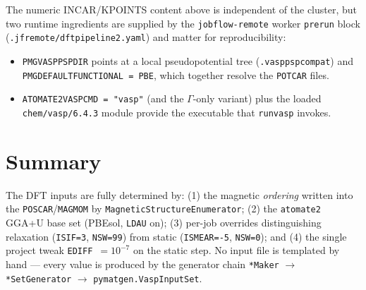\documentclass[11pt]{article}
\newcommand{\code}[1]{\texttt{\def\_{\textunderscore\allowbreak}#1}}
\begin{document}
The numeric INCAR/KPOINTS content above is independent of the cluster, but two
runtime ingredients are supplied by the \code{jobflow-remote} worker
\code{pre\_run} block (\code{.jfremote/dft\_pipeline2.yaml}) and matter for
reproducibility:

\begin{itemize}
  \item \code{PMG\_VASP\_PSP\_DIR} points at a local pseudopotential tree
        (\code{.vasp\_psp\_compat}) and \code{PMG\_DEFAULT\_FUNCTIONAL = PBE},
        which together resolve the \code{POTCAR} files.
  \item \code{ATOMATE2\_VASP\_CMD = "vasp"} (and the $\Gamma$-only variant) plus
        the loaded \code{chem/vasp/6.4.3} module provide the executable that
        \code{run\_vasp} invokes.
\end{itemize}

\section{Summary}

The DFT inputs are fully determined by: (1) the magnetic
\emph{ordering} written into the \code{POSCAR}/\code{MAGMOM} by
\code{MagneticStructureEnumerator}; (2) the \code{atomate2} GGA{+}U base set
(PBEsol, \code{LDAU} on); (3) per-job overrides distinguishing relaxation
(\code{ISIF=3}, \code{NSW=99}) from static (\code{ISMEAR=-5}, \code{NSW=0}); and
(4) the single project tweak \code{EDIFF}~$=10^{-7}$ on the static step. No input
file is templated by hand --- every value is produced by the generator chain
\code{*Maker} $\to$ \code{*SetGenerator} $\to$ \code{pymatgen.VaspInputSet}.
\end{document}
